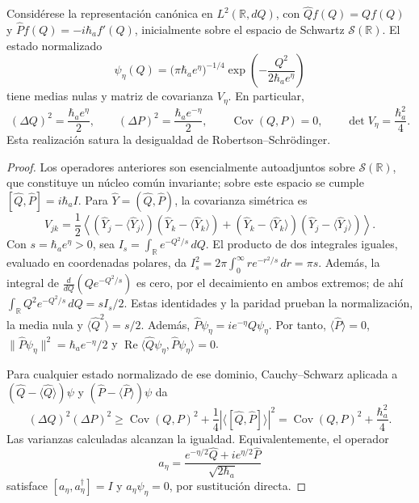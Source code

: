 \begin{proposition}
\label{md:antmem:covarianza-gaussiana}
Considérese la representación canónica en \(L^2(\mathbb R,dQ)\), con
\(\widehat Qf(Q)=Qf(Q)\) y
\(\widehat Pf(Q)=-i\hbar_a f'(Q)\), inicialmente sobre el espacio de
Schwartz \(\mathcal S(\mathbb R)\). El estado normalizado
\begin{equation}
 \psi_\eta(Q)=\bigl(\pi\hbar_a e^\eta\bigr)^{-1/4}
 \exp\!\left(-\frac{Q^2}{2\hbar_a e^\eta}\right)
 \label{md:antmem:gaussiana-accion}
\end{equation}
tiene medias nulas y matriz de covarianza \(V_\eta\). En particular,
\begin{equation}
 (\Delta Q)^2=\frac{\hbar_a e^\eta}{2},\qquad
 (\Delta P)^2=\frac{\hbar_a e^{-\eta}}{2},\qquad
 \operatorname{Cov}(Q,P)=0,\qquad
 \det V_\eta=\frac{\hbar_a^2}{4}.
 \label{md:antmem:varianzas-accion}
\end{equation}
Esta realización satura la desigualdad de Robertson--Schrödinger.
\end{proposition}

\begin{proof}
Los operadores anteriores son esencialmente autoadjuntos sobre
\(\mathcal S(\mathbb R)\), que constituye un núcleo común invariante;
sobre este espacio se cumple
\([\widehat Q,\widehat P]=i\hbar_a I\). Para
\(\widehat Y=(\widehat Q,\widehat P)\), la covarianza simétrica es
\[
 V_{jk}=\frac12\left\langle
 (\widehat Y_j-\langle\widehat Y_j\rangle)
 (\widehat Y_k-\langle\widehat Y_k\rangle)
 +(\widehat Y_k-\langle\widehat Y_k\rangle)
 (\widehat Y_j-\langle\widehat Y_j\rangle)
 \right\rangle.
\]
Con \(s=\hbar_a e^\eta>0\), sea
\(I_s=\int_{\mathbb R}e^{-Q^2/s}\,dQ\). El producto de dos
integrales iguales, evaluado en coordenadas polares, da
\(I_s^2=2\pi\int_0^\infty r e^{-r^2/s}\,dr=\pi s\).
Además, la integral de
\(\frac{d}{dQ}(Qe^{-Q^2/s})\) es cero, por el decaimiento en ambos
extremos; de ahí
\(\int_{\mathbb R}Q^2e^{-Q^2/s}\,dQ=sI_s/2\).
Estas identidades y la paridad prueban la normalización, la media nula y
\(\langle\widehat Q^2\rangle=s/2\). Además,
\(\widehat P\psi_\eta=i e^{-\eta}Q\psi_\eta\).
Por tanto, \(\langle\widehat P\rangle=0\),
\(\|\widehat P\psi_\eta\|^2=\hbar_a e^{-\eta}/2\) y
\(\operatorname{Re}\langle\widehat Q\psi_\eta,
\widehat P\psi_\eta\rangle=0\).

Para cualquier estado normalizado de ese dominio, Cauchy--Schwarz aplicada
a \((\widehat Q-\langle\widehat Q\rangle)\psi\) y
\((\widehat P-\langle\widehat P\rangle)\psi\) da
\[
 (\Delta Q)^2(\Delta P)^2
 \geq \operatorname{Cov}(Q,P)^2
       +\frac14\left|\langle[\widehat Q,\widehat P]\rangle\right|^2
 =\operatorname{Cov}(Q,P)^2+\frac{\hbar_a^2}{4}.
\]
Las varianzas calculadas alcanzan la igualdad. Equivalentemente, el
operador
\[
 a_\eta=\frac{e^{-\eta/2}\widehat Q
                  +i e^{\eta/2}\widehat P}{\sqrt{2\hbar_a}}
\]
satisface \([a_\eta,a_\eta^\dagger]=I\) y
\(a_\eta\psi_\eta=0\), por sustitución directa.
\end{proof}

